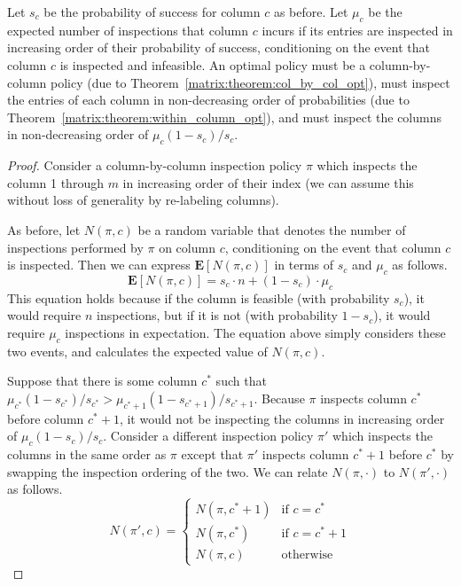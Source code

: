  \begin{theorem} \label{matrix:thm:main_result}
 	Let $s_c$ be the probability of success for column $c$ as before. 
 	Let $\mu_c$ be the expected number of inspections that column $c$ incurs if its entries are inspected in increasing order of their probability of success, conditioning on the event that column $c$ is inspected and infeasible.
 	An optimal policy must be a column-by-column policy (due to Theorem~\ref{matrix:theorem:col_by_col_opt}), must inspect the entries of each column in non-decreasing order of probabilities (due to Theorem~\ref{matrix:theorem:within_column_opt}), and must inspect the columns in non-decreasing order of $\mu_c(1 - s_c)/s_c$.
 \end{theorem}
 \begin{proof}
 	Consider a column-by-column inspection policy $\pi$ which inspects the column 1 through $m$ in increasing order of their index (we can assume this without loss of generality by re-labeling columns).
	
 	As before, let $N(\pi,c)$ be a random variable that denotes the number of inspections performed by $\pi$ on column $c$, conditioning on the event that column $c$ is inspected.
 	Then we can express $\mathbf{E}[N(\pi, c)]$ in terms of $s_c$ and $\mu_c$ as follows.
 	\begin{equation}\label{matrix:eqn:exp_cost_column_by_condition}
 		\mathbf{E}[N(\pi, c)] = s_c \cdot n  + (1-s_c) \cdot \mu_c
 	\end{equation}
 	This equation holds because if the column is feasible (with probability $s_c$), it would require $n$ inspections, but if it is not (with probability $1-s_c$), it would require $\mu_c$ inspections in expectation. The equation above simply considers these two events, and calculates the expected value of $N(\pi, c)$. 
	
 	Suppose that there is some column $c^*$ such that $\mu_{c^*}(1 - s_{c^*}) / s_{c^*} > \mu_{c^*+1} (1 - s_{c^*+1}) / s_{c^*+1}$. Because $\pi$ inspects column $c^*$ before column $c^*+1$, it would not be inspecting the columns in increasing order of $\mu_c(1-s_c)/s_c$.
 	Consider a different inspection policy $\pi'$ which inspects the columns in the same order as $\pi$ except that $\pi'$ inspects column $c^*+1$ before $c^*$ by swapping the inspection ordering of the two.
 	We can relate $N(\pi, \cdot)$ to $N(\pi', \cdot)$ as follows.
 	\begin{equation*}
 		N(\pi', c) = 
 		\begin{cases}
 			N(\pi, c^*+1) & \mbox{if~} c = c^* \\
 			N(\pi, c^*)   & \mbox{if~} c = c^* + 1 \\
 			N(\pi, c)     & \mbox{otherwise}
 		\end{cases}
 	\end{equation*}
	

\end{proof}
